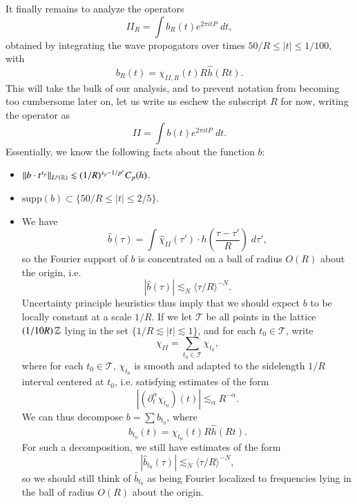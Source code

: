 It finally remains to analyze the operators
%
\[ II_R = \int b_R(t) e^{2 \pi i t P}\; dt, \]
%
obtained by integrating the wave propogators over times $50/R \leq |t| \leq 1/100$, with
%
\[ b_R(t) = \chi_{II,R}(t) R \widehat{h}(Rt). \]
%
This will take the bulk of our analysis, and to prevent notation from becoming too cumbersome later on, let us write us eschew the subscript $R$ for now, writing the operator as
%
\[ II = \int b(t) e^{2 \pi i t P}\; dt. \]
%
Essentially, we know the following facts about the function $b$:
%
\begin{itemize}
    \item $\| b \cdot t^{s_p} \|_{L^p(\operatorname{\mathbb{R}})} \lesssim (1/R)^{s_p - 1/p^*} C_p(h)$.

    \item $\text{supp}(b) \subset \{ 50/R \leq |t| \leq 2/5 \}$.

    \item We have
    \[ \widehat{b}(\tau) = \int \widehat{\chi}_{II}(\tau') \cdot h \left( \frac{\tau - \tau'}{R} \right)\; d\tau', \]
    so the Fourier support of $b$ is concentrated on a ball of radius $O(R)$ about the origin, i.e.
    \[ |\widehat{b}(\tau)| \lesssim_N \langle \tau / R \rangle^{-N}. \]
    Uncertainty principle heuristics thus imply that we should expect $b$ to be locally constant at a scale $1/R$. If we let $\mathcal{T}$ be all points in the lattice $(1/10R) \operatorname{\mathbb{Z}}$ lying in the set $\{ 1/R \lesssim |t| \lesssim 1 \}$, and for each $t_0 \in \mathcal{T}$, write
    \[ \chi_{II} = \sum_{t_0 \in \mathcal{T}} \chi_{t_0}, \]
    where for each $t_0 \in \mathcal{T}$, $\chi_{t_0}$ is smooth and adapted to the sidelength $1/R$ interval centered at $t_0$, i.e. satisfying estimates of the form
    \[ | (\partial_t^\alpha \chi_{t_0})(t) | \lesssim_\alpha R^{- \alpha}. \]
    We can thus decompose $b = \sum b_{t_0}$, where
    \[ b_{t_0}(t) = \chi_{t_0}(t) R \widehat{h}(Rt). \]
    For such a decomposition, we still have estimates of the form
    \[ |\widehat{b}_{t_0}(\tau)| \lesssim_N \langle \tau / R \rangle^{-N}, \]
    so we should still think of $\widehat{b}_{t_0}$ as being Fourier localized to frequencies lying in the ball of radius $O(R)$ about the origin.


\end{itemize}
